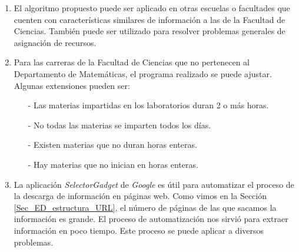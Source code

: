\begin{enumerate}
\item El algoritmo propuesto puede ser aplicado en otras escuelas o facultades que cuenten con características similares de información a las de la Facultad de Ciencias. También puede ser utilizado para resolver problemas generales de asignación de recursos.

\item Para las carreras de la Facultad de Ciencias que no pertenecen al Departamento de Matemáticas, el programa realizado se puede ajustar. Algunas extensiones pueden ser: %

%
%
%

\begin{itemize}
\item[-] Las materias impartidas en los laboratorios duran 2 o más horas.

\item[-] No todas las materias se imparten todos los días.

\item[-] Existen materias que no duran horas enteras.

\item[-] Hay materias que no inician en horas enteras.
\end{itemize}

\item La aplicación \textit{SelectorGadget} de \textit{Google} es útil para automatizar el proceso de la descarga de información en páginas web. Como vimos en la Sección \ref{Sec_ED_estructura_URL}, el número de páginas de las que sacamos la información es grande. El proceso de automatización nos sirvió para extraer información en poco tiempo. Este proceso se puede aplicar a diversos problemas. %

\end{enumerate}

